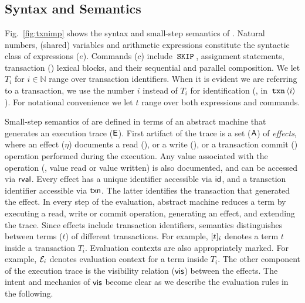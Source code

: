 \section{\txnimp}
\label{sec:opsem}



\subsection{Syntax and Semantics}
\label{sec:syntax}

Fig.~\ref{fig:txnimp} shows the syntax and small-step semantics of
\txnimp. Natural numbers, (shared) variables and arithmetic
expressions constitute the syntactic class of expressions ($e$).
Commands ($c$) include $\,{\tt SKIP}\,$, assignment statements, transaction
() lexical blocks, and their sequential and parallel
composition. We let $T_i$ for $i \in \mathbb{N}$ range over
transaction identifiers. When it is evident we are referring to a
transaction, we use the number $i$ instead of $T_i$ for identification
(\eg, in $\,{\tt txn}\,\langle i \rangle$). For notational convenience we let
$t$ range over both expressions and commands.

Small-step semantics of \txnimp are defined in terms of an abstract
machine that generates an execution trace ($\textsf{E}$). First artifact of the trace is a set ($\textsf{A}$) of \emph{effects},
where an effect ($\eta$) documents a read (), or a write
(), or a transaction commit () operation performed
during the execution. Any value associated with the operation (\eg,
value read or value written) is also documented, and can be accessed
via $\textsf{rval}$. Every effect has a unique identifier accessible via
$\textsf{id}$, and a transction identifier accessible via $\textsf{txn}$.  The latter
identifies the transaction that generated the effect. In every step of
the evaluation, abstract machine reduces a \txnimp term by executing a
read, write or commit operation, generating an effect, and extending
the trace. Since effects include transaction identifiers, semantics
distinguishes between terms ($t$) of different transactions. For
example, $\lbrack t \rbrack_i$ denotes a term $t$ inside a transaction $T_i$.
Evaluation contexts are also appropriately marked. For example,
$\mathcal{E}_i$ denotes evaluation context for a term inside $T_i$. The
other component of the execution trace is the visibility relation
($\textsf{vis}$) between the effects. The intent and mechanics of $\textsf{vis}$
become clear as we describe the evaluation rules in the following.

